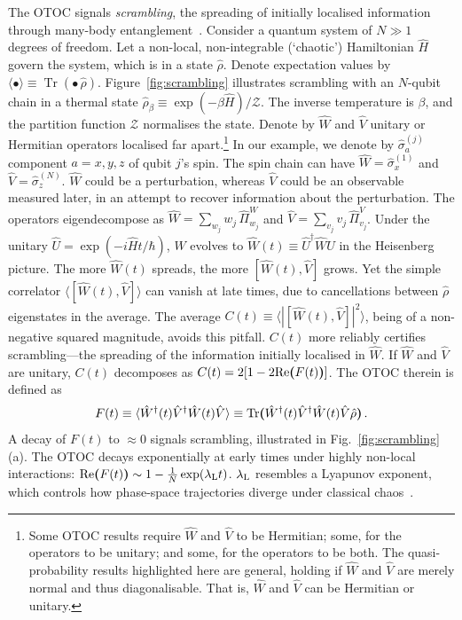 \documentclass[%
 reprint,
superscriptaddress,
nofootinbib,
bibnotes,
 amsmath,amssymb,
 aps,
]{revtex4-1}
\theoremstyle{plain}
\DeclareMathOperator{\Tr}{Tr}
\newcommand{\LParen}{ \bm{(} }
\newcommand{\RParen}{ \bm{)} }
\begin{document}
The OTOC signals \textit{scrambling}, the spreading of initially localised information through many-body entanglement~\cite{Swingle_Unscrambling_2018}.
Consider a quantum system of $N \gg 1$ degrees of freedom. Let a non-local, non-integrable (`chaotic') Hamiltonian $\hat{H}$ govern the system, which is in a state $\hat{\rho}$.
Denote expectation values by $\langle \bullet \rangle \equiv \Tr(\bullet \, \hat{\rho})$.
Figure~\ref{fig:scrambling} illustrates scrambling with an $N$-qubit chain in a thermal state $\hat{\rho}_\beta \equiv \exp(-\beta \hat{H})/\mathcal{Z}$. The inverse temperature is $\beta$, and the partition function $\mathcal{Z}$ normalises the state.
Denote by $\hat{W}$ and $\hat{V}$ unitary or Hermitian operators localised far apart.\footnote{Some OTOC results require $\hat{W}$ and $\hat{V}$ to be Hermitian; some, for the operators to be unitary; and some, for the operators to be both. The quasi-probability results highlighted here are general, holding if $\hat{W}$ and $\hat{V}$ are merely normal and thus diagonalisable. That is, $\hat{W}$ and $\hat{V}$ can be Hermitian or unitary.}
In our example, we denote by $\hat{\sigma}_a^{(j)}$ component $a = x, y, z$ of qubit $j$'s spin. 
The spin chain can have $\hat{W} = \hat{\sigma}_x^{(1)}$ and $\hat{V} = \hat{\sigma}_z^{(N)}$.
$\hat{W}$ could be a perturbation, whereas $\hat{V}$ could be an observable measured later, in an attempt to recover information about the perturbation.
The operators eigendecompose as ${\hat{W}} = \sum_{w_j} w_j \, \hat{\Pi}_{w_j}^{W}$ and $\hat{V} = \sum_{v_j} v_j \, \hat{\Pi}_{v_j}^{V}$.
Under the unitary $\hat{U} = \exp(-i \hat{H} t/\hbar)$, ${\hat{W}}$ evolves to ${\hat{W}}(t) \equiv \hat{U}^\dagger {\hat{W}} \hat{U}$ in the Heisenberg picture.
The more $\hat{W}(t)$ spreads, the more $[\hat{W}(t), \hat{V}]$ grows. Yet the simple correlator
$\langle [{\hat{W}}(t), \hat{V}]\rangle$ can vanish at late times, due to cancellations between $\hat{\rho}$ eigenstates in the average. The average  
$C(t) \equiv \langle | [{\hat{W}}(t), \hat{V}] |^2\rangle$, 
being of a non-negative squared magnitude, avoids this pitfall.
$C(t)$ more reliably certifies scrambling---the spreading of the information initially localised in $\hat{W}$.
If $\hat{W}$ and $\hat{V}$ are unitary, $C(t)$ decomposes as  $C(t) = 2[ 1 - 2 {\rm Re} \LParen F(t) \RParen ]$. The OTOC therein is defined as
\begin{equation}\label{eq:OTOC-def}
	F(t) \equiv \langle {\hat{W}}^\dagger (t) \hat{V}^\dagger {\hat{W}}(t) \hat{V} \rangle \equiv {\rm Tr} \LParen {\hat{W}}^\dagger (t) \hat{V}^\dagger {\hat{W}}(t) \hat{V} \hat{\rho}\RParen \, .
\end{equation}
A decay of $F(t)$ to $\approx 0$ signals scrambling, illustrated in Fig.~\ref{fig:scrambling}(a). 
The OTOC decays exponentially at early times under highly non-local interactions: ${\rm Re}\LParen F(t)\RParen \sim 1 - \frac{1}{N}\exp(\lambda_{\rm L} t)$.
$\lambda_{\rm L}$ 
resembles a Lyapunov exponent, which controls 
how phase-space trajectories diverge under classical chaos~\cite{Rozenbaum_lyapunov_2017}.
\end{document}
